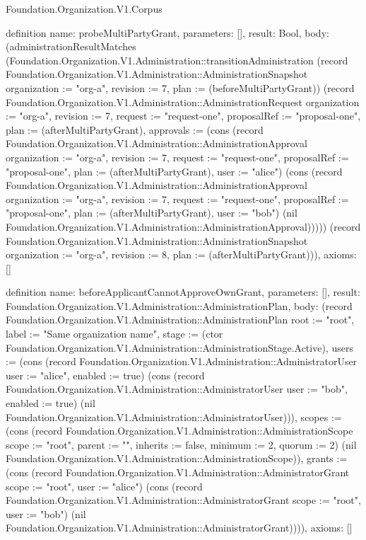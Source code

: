 \begin{lexlean}{Foundation.Organization.V1.Corpus}
\begin{semanticmodule}
definition{
  name: probeMultiPartyGrant,
  parameters: [],
  result: Bool,
  body: (administrationResultMatches (Foundation.Organization.V1.Administration::transitionAdministration (record Foundation.Organization.V1.Administration::AdministrationSnapshot {organization := "org-a", revision := 7, plan := (beforeMultiPartyGrant)}) (record Foundation.Organization.V1.Administration::AdministrationRequest {organization := "org-a", revision := 7, request := "request-one", proposalRef := "proposal-one", plan := (afterMultiPartyGrant), approvals := (cons (record Foundation.Organization.V1.Administration::AdministrationApproval {organization := "org-a", revision := 7, request := "request-one", proposalRef := "proposal-one", plan := (afterMultiPartyGrant), user := "alice"}) (cons (record Foundation.Organization.V1.Administration::AdministrationApproval {organization := "org-a", revision := 7, request := "request-one", proposalRef := "proposal-one", plan := (afterMultiPartyGrant), user := "bob"}) (nil Foundation.Organization.V1.Administration::AdministrationApproval)))})) (record Foundation.Organization.V1.Administration::AdministrationSnapshot {organization := "org-a", revision := 8, plan := (afterMultiPartyGrant)})),
  axioms: []
}

definition{
  name: beforeApplicantCannotApproveOwnGrant,
  parameters: [],
  result: Foundation.Organization.V1.Administration::AdministrationPlan,
  body: (record Foundation.Organization.V1.Administration::AdministrationPlan {root := "root", label := "Same organization name", stage := (ctor Foundation.Organization.V1.Administration::AdministrationStage.Active), users := (cons (record Foundation.Organization.V1.Administration::AdministratorUser {user := "alice", enabled := true}) (cons (record Foundation.Organization.V1.Administration::AdministratorUser {user := "bob", enabled := true}) (nil Foundation.Organization.V1.Administration::AdministratorUser))), scopes := (cons (record Foundation.Organization.V1.Administration::AdministrationScope {scope := "root", parent := "", inherits := false, minimum := 2, quorum := 2}) (nil Foundation.Organization.V1.Administration::AdministrationScope)), grants := (cons (record Foundation.Organization.V1.Administration::AdministratorGrant {scope := "root", user := "alice"}) (cons (record Foundation.Organization.V1.Administration::AdministratorGrant {scope := "root", user := "bob"}) (nil Foundation.Organization.V1.Administration::AdministratorGrant)))}),
  axioms: []
}


\end{semanticmodule}
\end{lexlean}
